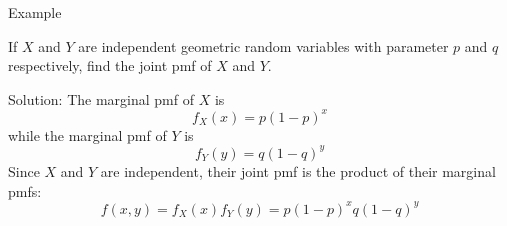 \documentclass[xcolor=table]{beamer}
\renewcommand{\emph}{\textbf}
\begin{document}
\begin{frame}{Example}
\begin{block}{}
If $X$ and $Y$ are independent geometric random variables with parameter $p$ and $q$ respectively, find the joint pmf of $X$ and $Y$.
\end{block}
\pause Solution: The marginal pmf of $X$ is
$$f_X(x) = p(1-p)^x$$
\pause while the marginal pmf of $Y$ is
$$f_Y(y) = q(1-q)^y$$
\pause Since $X$ and $Y$ are independent, their joint pmf is the product of their marginal pmfs:
$$f(x,y) = f_X(x)f_Y(y) = p(1-p)^xq(1-q)^y$$
\end{frame}


%
%
%
\end{document}
